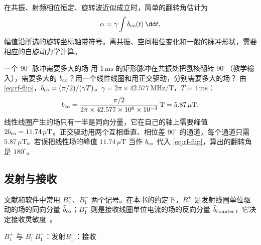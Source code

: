 
在共振、射频相位恒定、旋转波近似成立时，简单的翻转角估计为
\begin{equation}
\alpha=\gamma\int b_{\rm co}(t)\,\dd t,
\label{eq:rf-flip}
\end{equation}
幅值沿所选的旋转坐标轴带符号。离共振、空间相位变化和一般的脉冲形状，需要相应的自旋动力学计算。

\begin{example}[label=ex:rf-flip]{一个 $90^\circ$ 脉冲需要多大的场}
用 $1\,\mathrm{ms}$ 的矩形脉冲在共振处把氢核翻转 $90^\circ$（教学输入），需要多大的 $b_{\rm co}$？用一个线性线圈和用正交驱动，分别需要多大的场？
\solution
由 \eqref{eq:rf-flip}，$b_{\rm co}=(\pi/2)/(\gamma T)$。$\gamma=2\pi\times42.577\,\mathrm{MHz/T}$，$T=1\,\mathrm{ms}$：
\begin{equation*}
b_{\rm co}=\frac{\pi/2}{2\pi\times42.577\times10^6\times10^{-3}}\,\mathrm T=5.87\,\mu\mathrm T .
\end{equation*}
线性线圈产生的场只有一半是同向分量，它在自己的轴上需要峰值 $2b_{\rm co}=11.74\,\mu\mathrm T$。正交驱动用两个互相垂直、相位差 $90^\circ$ 的通道，每个通道只需 $5.87\,\mu\mathrm T$。若误把线性场的峰值 $11.74\,\mu\mathrm T$ 当作 $b_{\rm co}$ 代入 \eqref{eq:rf-flip}，算出的翻转角是 $180^\circ$。
\end{example}

\subsection{发射与接收}
文献和软件中常用 $B_1^+$、$B_1^-$ 两个记号。在本书的约定下，$B_1^+$ 是发射线圈单位驱动的场的同向分量 $\widetilde b_{\rm co}$；$B_1^-$ 则是接收线圈单位电流的场的反向分量 $\widetilde b_{\rm counter}$，它决定接收灵敏度~\cite{rf}。

\begin{compare}{$B_1^+$ 与 $B_1^-$}{$B_1^+$：发射}{$B_1^-$：接收}
\end{compare}

